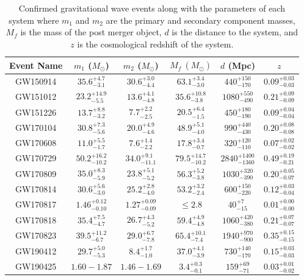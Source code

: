 \documentclass [12pt, proquest]{uwthesis}[2019]
\begin{document}
\begin{table}
\begin{center}
\bgroup
\def\arraystretch{1.5}
\begin{tabular}{| c | c | c | c | c | c |}
\hline
Event Name & $m_1$ ($M_\odot$) & $m_2$ ($M_\odot$) & $M_f\ (M_\odot)$ & $d$ (Mpc) & $z$\\
\hline \hline
GW150914 & $35.6^{+4.7}_{-3.1}$ & $30.6^{+3.0}_{-4.4}$ & $63.1^{+3.4}_{-3.0}$ & $440^{+150}_{-170}$ & $0.09^{+0.03}_{-0.03}$\\
\hline
GW151012 & $23.2^{+14.9}_{-5.5}$ & $13.6^{+4.1}_{-4.8}$  & $35.6^{+10.8}_{-3.8}$ & $1080^{+550}_{-490}$& $0.21^{+0.09}_{-0.09}$\\
\hline
GW151226 & $13.7^{+8.8}_{-3.2}$ & $7.7^{+2.2}_{-2.5}$ & $20.5^{+6.4}_{-1.5}$ & $450^{+180}_{-190}$ & $0.09^{+0.04}_{-0.04}$\\
\hline
\hline
GW170104 & $30.8^{+7.3}_{-5.6}$ & $20.0^{+4.9}_{-4.6}$ & $48.9^{+5.1}_{-4.0}$ & $990^{+440}_{-430}$ & $0.20^{+0.08}_{-0.08}$\\
\hline
GW170608 & $11.0^{+5.5}_{-1.7}$ & $7.6^{+1.4}_{-2.2}$ & $17.8^{+3.4}_{-0.7}$ & $320^{+120}_{-110}$ & $0.07^{+0.02}_{-0.02}$\\
\hline
GW170729 & $50.2^{+16.2}_{-10.2}$ & $34.0^{+9.1}_{-11.1}$ & $79.5^{+14.7}_{-10.2}$ & $2840^{+1400}_{-1360}$ & $0.49^{+0.19}_{-0.21}$\\
\hline
GW170809 & $35.0^{+8.3}_{-5.9}$ & $23.8^{+5.1}_{-5.2}$ & $56.3^{+5.2}_{-3.8}$ & $1030^{+320}_{-390}$ & $0.20^{+0.05}_{-0.07}$\\
\hline
GW170814 & $30.6^{+5.6}_{-3.0}$ & $25.2^{+2.8}_{-4.0}$ & $53.2^{+3.2}_{-2.4}$ & $600^{+150}_{-220}$ & $0.12^{+0.03}_{-0.04}$\\
\hline
GW170817 & $1.46^{+0.12}_{-0.10}$ & $1.27^{+0.09}_{-0.09}$ & $\le2.8$ & $40^{+7}_{-15}$ & $0.01^{+0.00}_{-0.00}$\\
\hline
GW170818 & $35.4^{+7.5}_{-4.7}$ & $26.7^{+4.3}_{-5.2}$ & $59.4^{+4.9}_{-4.8}$ & $1060^{+420}_{-380}$ & $0.21^{+0.07}_{-0.07}$\\
\hline
GW170823 & $39.5^{+11.2}_{-6.7}$ & $29.0^{+6.7}_{-7.8}$ & $65.4^{+10.1}_{-7.4}$ & $1940^{+970}_{-900}$ & $0.35^{+0.15}_{-0.15}$\\
\hline
\hline
GW190412 & $29.7^{+5.0}_{-5.3}$ & $8.4^{+1.7}_{-1.0}$ & $37.0^{+4.1}_{-3.9}$ & $730^{+140}_{-170}$ & $0.15^{+0.03}_{-0.03}$\\
\hline
GW190425 & $1.60-1.87$ & $1.46-1.69$ & $3.4^{+0.3}_{-0.1}$ & $159^{+69}_{-71}$ & $0.03^{+0.01}_{-0.02}$\\
\hline
\end{tabular}
\egroup

\caption[Confirmed gravitational wave events]{Confirmed gravitational wave events along with the parameters of each system where $m_1$ and $m_2$ are the primary and secondary component masses, $M_f$ is the mass of the post merger object, $d$ is the distance to the system, and $z$ is the cosmological redshift of the system.}\label{gwTable}
\end{center}
\end{table}
\end{document}
